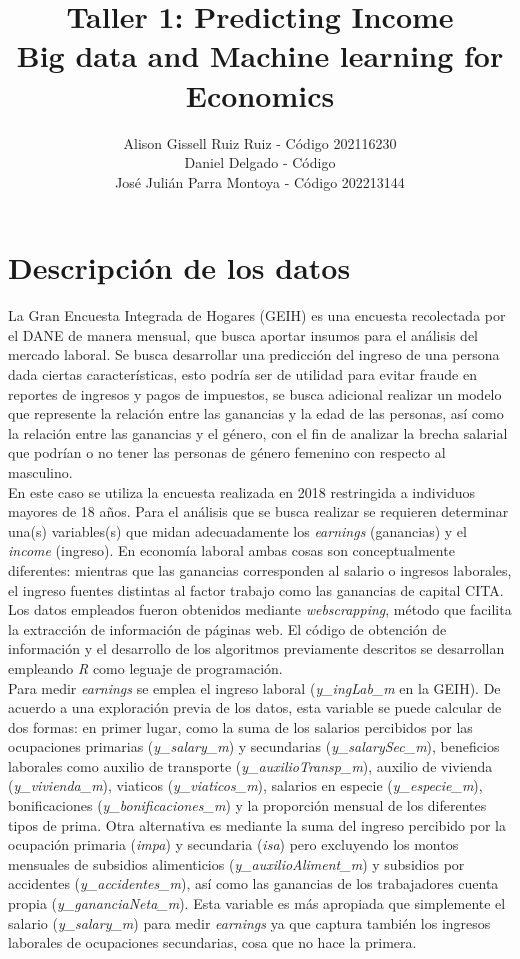 \documentclass[11pt,a4paper]{article}
\title{\bf Taller 1: Predicting Income \\ Big data and Machine learning for Economics}
\author{Alison Gissell Ruiz Ruiz - Código 202116230\\ 
Daniel Delgado - Código\\
José Julián Parra Montoya - Código 202213144 }
\date{}
\begin{document}
\maketitle

\section{Descripción de los datos}

La Gran Encuesta Integrada de Hogares (GEIH) es una encuesta recolectada por el DANE de manera mensual, que busca aportar insumos para el análisis del mercado laboral. Se busca desarrollar una predicción del ingreso de una persona dada ciertas características, esto podría ser de utilidad para evitar fraude en reportes de ingresos y pagos de impuestos, se busca adicional realizar un modelo que represente la relación entre las ganancias y la edad de las personas, así como la relación entre las ganancias y el género, con el fin de analizar la brecha salarial que podrían o no tener las personas de género femenino con respecto al masculino. \\

En este caso se utiliza la encuesta realizada en 2018 restringida a individuos mayores de 18 años. Para el análisis que se busca realizar se requieren determinar una(s) variables(s) que midan adecuadamente los \emph{earnings} (ganancias) y el \emph{income} (ingreso). 
En economía laboral ambas cosas son conceptualmente diferentes: mientras que las ganancias corresponden al salario o ingresos laborales, el ingreso fuentes distintas al factor trabajo como las ganancias de capital CITA. Los datos empleados fueron obtenidos mediante \emph{webscrapping}, método que facilita la extracción de información de páginas web. El código de obtención de información y el desarrollo de los algoritmos previamente descritos se desarrollan empleando \emph{R} como leguaje de programación.
\\

Para medir \emph{earnings} se emplea el ingreso laboral (\textit{y\_ingLab\_m} en la GEIH). De acuerdo a una exploración previa de los datos, esta variable se puede calcular de dos formas: en primer lugar, como la suma de los salarios 
percibidos por las ocupaciones primarias (\textit{y\_salary\_m}) y secundarias (\textit{y\_salarySec\_m}), beneficios laborales como auxilio de transporte (\textit{y\_auxilioTransp\_m}), auxilio de vivienda (\textit{y\_vivienda\_m}), viaticos (\textit{y\_viaticos\_m}), salarios en especie (\textit{y\_especie\_m}), 
bonificaciones (\textit{y\_bonificaciones\_m}) y la proporción mensual de los diferentes tipos de prima. Otra alternativa es mediante la suma del ingreso percibido por la ocupación primaria (\textit{impa}) y secundaria (\textit{isa}) pero excluyendo los montos mensuales de subsidios alimenticios (\textit{y\_auxilioAliment\_m}) y subsidios por accidentes (\textit{y\_accidentes\_m}), así como las ganancias de los trabajadores cuenta propia (\textit{y\_gananciaNeta\_m}). Esta variable es más apropiada que simplemente el salario (\textit{y\_salary\_m}) para medir \emph{earnings} ya que captura también los ingresos laborales de ocupaciones secundarias, cosa que no hace la primera.\\
\end{document}
